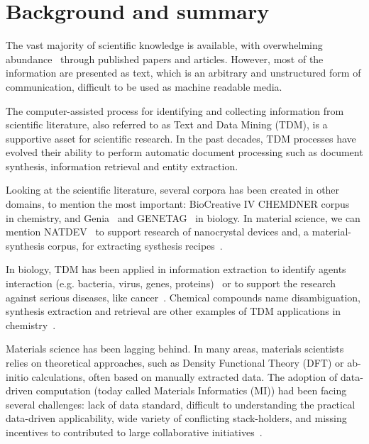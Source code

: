 \documentclass[a4paper,10pt]{article}
\begin{document}
\newpage

\section{Background and summary}
The vast majority of scientific knowledge is available, with overwhelming abundance~\cite{Grigas2017JustGI, Khabsa2014TheNO, OrduaMalea2015MethodsFE, Bjrk2009ScientificJP} through published papers and articles. 
However, most of the information are presented as text, which is an arbitrary and unstructured form of communication, difficult to be used as machine readable media. 

The computer-assisted process for identifying and collecting information from scientific literature, also referred to as Text and Data Mining (TDM), is a supportive asset for scientific research. 
In the past decades, TDM processes have evolved their ability to perform automatic document processing such as document synthesis, information retrieval and entity extraction. 


Looking at the scientific literature, several corpora has been created in other domains, to mention the most important: BioCreative IV CHEMDNER corpus~\cite{Krallinger2015TheCC} in chemistry, and Genia~\cite{Kim2003GENIAC} and GENETAG~\cite{Tanabe2005GENETAGAT, Ohta2009IncorporatingGA} in biology. In material science, we can mention NATDEV~\cite{Dieb2016} to support research of nanocrystal devices and, a material-synthesis corpus, for extracting systhesis recipes~\cite{kononova_text-mined_2019}. 

In biology, TDM has been applied in information extraction to identify agents interaction (e.g. bacteria, virus, genes, proteins)~\cite{10.1371/journal.pone.0004554, Krallinger2010, Krallinger2009ExtractionOH} or to support the research against serious diseases, like cancer~\cite{Krasnitz2019CancerB}. 
Chemical compounds name disambiguation, synthesis extraction and retrieval are other examples of TDM applications in chemistry~\cite{Hawizy2011ChemicalTaggerAT}.

Materials science has been lagging behind. In many areas, materials scientists relies on theoretical approaches, such as Density Functional Theory (DFT) or ab-initio calculations, often based on manually extracted data. 
The adoption of data-driven computation (today called Materials Informatics (MI)) had been facing several challenges: lack of data standard, difficult to understanding the practical data-driven applicability, wide variety of conflicting stack-holders, and missing incentives to contributed to large collaborative initiatives~\cite{Hill2016MaterialsSW}. 
\end{document}
